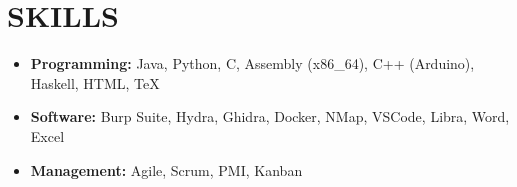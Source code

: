 \section*{SKILLS}
\begin{itemize}
    \item \textbf{Programming:} Java, Python, C, Assembly (x86\_64), C++ (Arduino), Haskell, HTML, \TeX{}
    \item \textbf{Software:} Burp Suite, Hydra, Ghidra, Docker, NMap, VSCode, Libra, Word, Excel
    \item \textbf{Management:} Agile, Scrum, PMI, Kanban
\end{itemize}